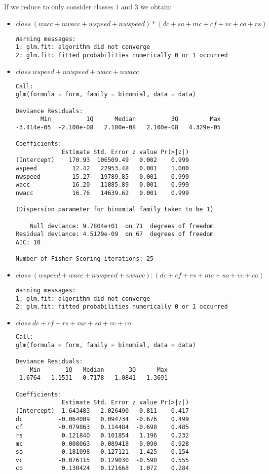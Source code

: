 \documentclass[11pt, a4paper, twoside, openright]{article}
\begin{document}
If we reduce to only consider classes $1$ and $3$ we obtain:
\begin{itemize}
\item $class~(wacc+nwacc+wspeed+nwspeed)*(dc+so+mc+cf+vc+co+rs)$
\begin{verbatim}
Warning messages:
1: glm.fit: algorithm did not converge 
2: glm.fit: fitted probabilities numerically 0 or 1 occurred
\end{verbatim}
\item $class~wspeed+nwspeed+wacc+nwacc$
\begin{verbatim}
Call:
glm(formula = form, family = binomial, data = data)

Deviance Residuals: 
       Min          1Q      Median          3Q         Max  
-3.414e-05  -2.100e-08   2.100e-08   2.100e-08   4.329e-05  

Coefficients:
             Estimate Std. Error z value Pr(>|z|)
(Intercept)    170.93  106509.49   0.002    0.999
wspeed          12.42   22953.48   0.001    1.000
nwspeed         15.27   19789.85   0.001    0.999
wacc            16.20   11885.89   0.001    0.999
nwacc           16.76   14639.62   0.001    0.999

(Dispersion parameter for binomial family taken to be 1)

    Null deviance: 9.7804e+01  on 71  degrees of freedom
Residual deviance: 4.5129e-09  on 67  degrees of freedom
AIC: 10

Number of Fisher Scoring iterations: 25
\end{verbatim}
\item $class~(wspeed+wacc+nwspeed+nwacc):(dc+cf+rs+mc+so+vc+co)$
\begin{verbatim}
Warning messages:
1: glm.fit: algorithm did not converge 
2: glm.fit: fitted probabilities numerically 0 or 1 occurred 
\end{verbatim}
\item $class~dc+cf+rs+mc+so+vc+co$
\begin{verbatim}
Call:
glm(formula = form, family = binomial, data = data)

Deviance Residuals: 
    Min       1Q   Median       3Q      Max  
-1.6764  -1.1531   0.7178   1.0841   1.3691  

Coefficients:
             Estimate Std. Error z value Pr(>|z|)
(Intercept)  1.643483   2.026490   0.811    0.417
dc          -0.064009   0.094734  -0.676    0.499
cf          -0.079863   0.114484  -0.698    0.485
rs           0.121840   0.101854   1.196    0.232
mc           0.008063   0.089418   0.090    0.928
so          -0.181098   0.127121  -1.425    0.154
vc          -0.076115   0.129030  -0.590    0.555
co           0.130424   0.121668   1.072    0.284


\end{verbatim}
\end{itemize}
\end{document}
